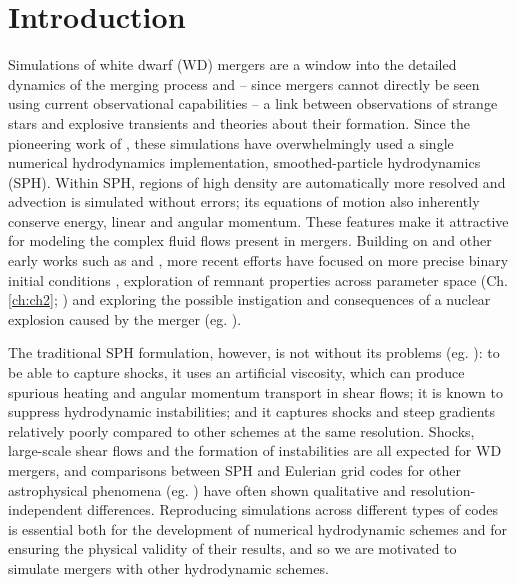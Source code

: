 \section{Introduction}
\label{sec:c3_intro}


Simulations of white dwarf (WD) mergers are a window into the detailed dynamics of the merging process and -- since mergers cannot directly be seen using current observational capabilities -- a link between observations of strange stars and explosive transients and theories about their formation.  Since the pioneering work of \cite{benz+90}, these simulations have overwhelmingly used a single numerical hydrodynamics implementation, smoothed-particle hydrodynamics (SPH).  Within SPH, regions of high density are automatically more resolved and advection is simulated without errors; its equations of motion also inherently conserve energy, linear and angular momentum.  These features make it attractive for modeling the complex fluid flows present in mergers.  Building on \citeauthor{benz+90} and other early works such as \cite{segrcm97} and \cite{guerig04}, more recent efforts have focused on more precise binary initial conditions \citep{dan+11}, exploration of remnant properties across parameter space (Ch. \ref{ch:ch2}; \citealt{loreig09, rask+12, dan+14}) and exploring the possible instigation and consequences of a nuclear explosion caused by the merger (eg. \citealt{pakm+10, dan+12, pakm+13, moll+14, rask+14}).

The traditional SPH formulation, however, is not without its problems (eg. \citealt{spri10,hopk15}): to be able to capture shocks, it uses an artificial viscosity, which can produce spurious heating and angular momentum transport in shear flows; it is known to suppress hydrodynamic instabilities; and it captures shocks and steep gradients relatively poorly compared to other schemes at the same resolution.  Shocks, large-scale shear flows and the formation of instabilities are all expected for WD mergers, and comparisons between SPH and Eulerian grid codes for other astrophysical phenomena (eg. \citealt{dval+06, tracsp07, mitc+09}) have often shown qualitative and resolution-independent differences.  Reproducing simulations across different types of codes is essential both for the development of numerical hydrodynamic schemes and for ensuring the physical validity of their results, and so we are motivated to simulate mergers with other hydrodynamic schemes.

